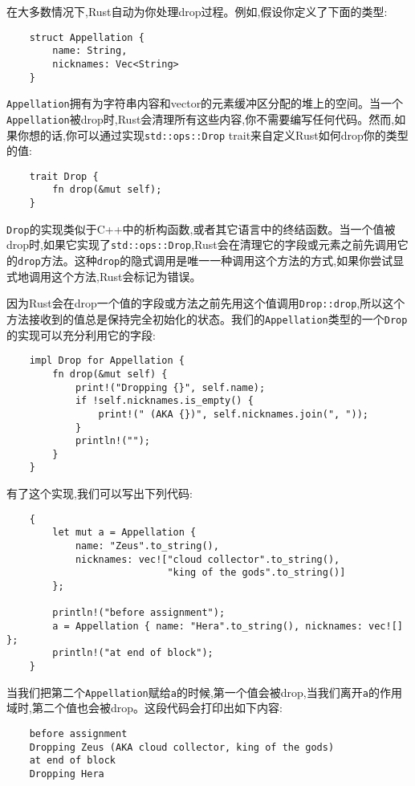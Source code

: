 在大多数情况下,Rust自动为你处理drop过程。例如,假设你定义了下面的类型:
\begin{verbatim}
    struct Appellation {
        name: String,
        nicknames: Vec<String>
    }
\end{verbatim}

\texttt{Appellation}拥有为字符串内容和vector的元素缓冲区分配的堆上的空间。当一个\texttt{Appellation}被drop时,Rust会清理所有这些内容,你不需要编写任何代码。然而,如果你想的话,你可以通过实现\texttt{std::ops::Drop} trait来自定义Rust如何drop你的类型的值:
\begin{verbatim}
    trait Drop {
        fn drop(&mut self);
    }
\end{verbatim}

\texttt{Drop}的实现类似于C++中的析构函数,或者其它语言中的终结函数。当一个值被drop时,如果它实现了\texttt{std::ops::Drop},Rust会在清理它的字段或元素之前先调用它的\texttt{drop}方法。这种\texttt{drop}的隐式调用是唯一一种调用这个方法的方式,如果你尝试显式地调用这个方法,Rust会标记为错误。

因为Rust会在drop一个值的字段或方法之前先用这个值调用\texttt{Drop::drop},所以这个方法接收到的值总是保持完全初始化的状态。我们的\texttt{Appellation}类型的一个\texttt{Drop}的实现可以充分利用它的字段:
\begin{verbatim}
    impl Drop for Appellation {
        fn drop(&mut self) {
            print!("Dropping {}", self.name);
            if !self.nicknames.is_empty() {
                print!(" (AKA {})", self.nicknames.join(", "));
            }
            println!("");
        }
    }
\end{verbatim}

有了这个实现,我们可以写出下列代码:
\begin{verbatim}
    {
        let mut a = Appellation {
            name: "Zeus".to_string(),
            nicknames: vec!["cloud collector".to_string(),
                            "king of the gods".to_string()]
        };

        println!("before assignment");
        a = Appellation { name: "Hera".to_string(), nicknames: vec![] };
        println!("at end of block");
    }
\end{verbatim}

当我们把第二个\texttt{Appellation}赋给\texttt{a}的时候,第一个值会被drop,当我们离开\texttt{a}的作用域时,第二个值也会被drop。这段代码会打印出如下内容:
\begin{verbatim}
    before assignment
    Dropping Zeus (AKA cloud collector, king of the gods)
    at end of block
    Dropping Hera
\end{verbatim}

